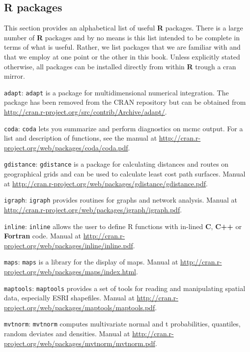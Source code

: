\subsection{R packages}
This section provides an alphabetical list of useful {\bf R}  packages. There is a large number of {\bf R} packages and by no means is this list intended to be complete in terms of what is useful. Rather, we list packages that we are familiar with and that we employ at one point or the other in this book. Unless explicitly stated otherwise, all packages can be installed directly from within {\bf R} trough a cran mirror. 

 {\flushleft \tt adapt}:
\mbox{\tt adapt} \citep{genz_etal:2007} is a package for multidimensional numerical integration.
The package has been removed from the CRAN repository but can be obtained from \url{http://cran.r-project.org/src/contrib/Archive/adapt/}.

 {\flushleft \tt coda}: 
\mbox{\tt coda} \citep{plummer_etal:2006} lets you summarize and perform diagnostics on mcmc output. For a list and description of functions, see the manual at \url{http://cran.r-project.org/web/packages/coda/coda.pdf}. 

 {\flushleft \tt gdistance}:
\mbox{\tt gdistance} \citep{vanetten:2011} is a package for calculating distances and routes on geographical grids and can be used to calculate least cost path surfaces. Manual at \url{http://cran.r-project.org/web/packages/gdistance/gdistance.pdf}.
 
 {\flushleft \tt igraph}:
  \mbox{\tt igraph} \citep{csardi:2010} provides routines for graphs and network analysis. Manual at \url{http://cran.r-project.org/web/packages/igraph/igraph.pdf}. 

 {\flushleft \tt inline}:
  \mbox{\tt inline} \citep{sklyar_etal:2010} allows the user to define R functions with in-lined {\bf C}, {\bf C++} or {\bf Fortran} code. Manual at \url{http://cran.r-project.org/web/packages/inline/inline.pdf}. 
  
 {\flushleft \tt maps}: 
\mbox{\tt maps} \citep{becker_etal:2012} is a library for the display of maps. Manual at \url{http://cran.r-project.org/web/packages/maps/index.html}. 

 {\flushleft \tt maptools}:
\mbox{\tt maptools} \citep{bivand_levin-koh:2013} provides a set of tools for reading and manipulating spatial data, especially ESRI shapefiles. Manual at \url{http://cran.r-project.org/web/packages/maptools/maptools.pdf}. 

 {\flushleft \tt mvtnorm}:
\mbox{\tt mvtnorm} \citep{genz_etal:2012} computes multivariate normal and t probabilities, quantiles, random deviates and densities. Manual at \url{http://cran.r-project.org/web/packages/mvtnorm/mvtnorm.pdf}. 

